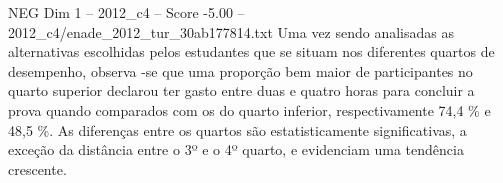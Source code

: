 \begin{textsample}{NEG Dim 1 – 2012\_c4 – Score -5.00 – 2012\_c4/enade\_2012\_tur\_30ab177814.txt}
Uma vez sendo analisadas as alternativas escolhidas pelos estudantes que se situam nos diferentes quartos de desempenho, observa -se que uma proporção bem maior de participantes no quarto superior declarou ter gasto entre duas e quatro horas para concluir a prova quando comparados com os do quarto inferior, respectivamente 74,4 \% e 48,5 \%.
As diferenças entre os quartos são estatisticamente significativas, a exceção da distância entre o 3º e o 4º quarto, e evidenciam uma tendência crescente.

\end{textsample}
